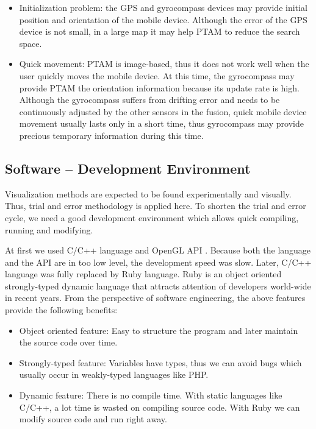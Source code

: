 \begin{itemize}
	\item Initialization problem: the GPS and gyrocompass devices may provide initial position and orientation of the mobile device. Although the error of the GPS device is not small, in a large map it may help PTAM to reduce the search space.
	\item Quick movement: PTAM is image-based, thus it does not work well when the user quickly moves the mobile device. At this time, the gyrocompass may provide PTAM the orientation information because its update rate is high. Although the gyrocompass suffers from drifting error and needs to be continuously adjusted by the other sensors in the fusion, quick mobile device movement usually lasts only in a short time, thus gyrocompass may provide precious temporary information during this time.
\end{itemize}

\subsection{Software -- Development Environment}

Visualization methods are expected to be found experimentally and visually. Thus, trial and error methodology is applied here. To shorten the trial and error cycle, we need a good development environment which allows quick compiling, running and modifying.

At first we used C/C++ language and OpenGL API \cite{Reference10}. Because both the language and the API are in too low level, the development speed was slow. Later, C/C++ language was fully replaced by Ruby language. Ruby is an object oriented strongly-typed dynamic language that attracts attention of developers world-wide in recent years. From the perspective of software engineering, the above features provide the following benefits:

\begin{itemize}
	\item Object oriented feature: Easy to structure the program and later maintain the source code over time.
	\item Strongly-typed feature: Variables have types, thus we can avoid bugs which usually occur in weakly-typed languages like PHP.
	\item Dynamic feature: There is no compile time. With static languages like C/C++, a lot time is wasted on compiling source code. With Ruby we can modify source code and run right away.
\end{itemize}

